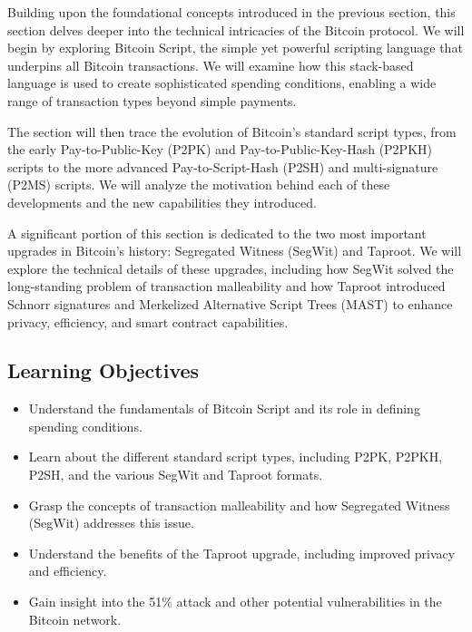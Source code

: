 Building upon the foundational concepts introduced in the previous
section, this section delves deeper into the technical intricacies of
the Bitcoin protocol. We will begin by exploring Bitcoin Script, the
simple yet powerful scripting language that underpins all Bitcoin
transactions. We will examine how this stack-based language is used to
create sophisticated spending conditions, enabling a wide range of
transaction types beyond simple payments.

The section will then trace the evolution of Bitcoin's standard script
types, from the early Pay-to-Public-Key (P2PK) and
Pay-to-Public-Key-Hash (P2PKH) scripts to the more advanced
Pay-to-Script-Hash (P2SH) and multi-signature (P2MS) scripts. We will
analyze the motivation behind each of these developments and the new
capabilities they introduced.

A significant portion of this section is dedicated to the two most
important upgrades in Bitcoin's history: Segregated Witness (SegWit) and
Taproot. We will explore the technical details of these upgrades,
including how SegWit solved the long-standing problem of transaction
malleability and how Taproot introduced Schnorr signatures and
Merkelized Alternative Script Trees (MAST) to enhance privacy,
efficiency, and smart contract capabilities.


\subsection{Learning Objectives}\label{learning-objectives}

\begin{itemize}
	\tightlist
	\item
	Understand the fundamentals of Bitcoin Script and its role in defining
	spending conditions.
	\item
	Learn about the different standard script types, including P2PK,
	P2PKH, P2SH, and the various SegWit and Taproot formats.
	\item
	Grasp the concepts of transaction malleability and how Segregated
	Witness (SegWit) addresses this issue.
	\item
	Understand the benefits of the Taproot upgrade, including improved
	privacy and efficiency.
	\item
	Gain insight into the 51\% attack and other potential vulnerabilities
	in the Bitcoin network.
\end{itemize}

